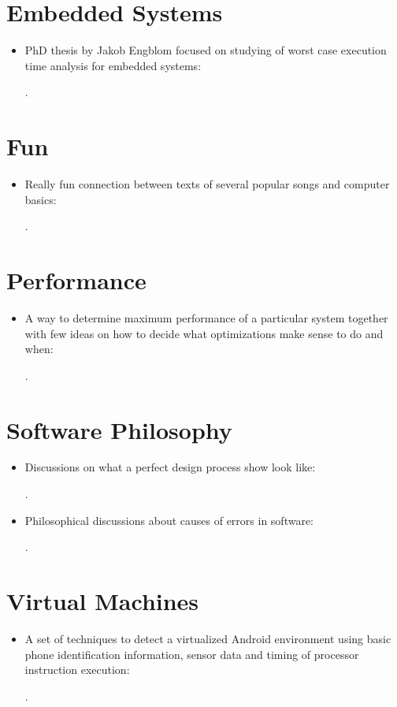 \section*{Embedded Systems}
\begin{itemize}
    \item PhD thesis by Jakob Engblom focused on studying of worst case execution time analysis for embedded systems:

    \cite{Engblom:WCET:2002}.
\end{itemize}

\section*{Fun}
\begin{itemize}
    \item Really fun connection between texts of several popular songs and computer basics:

    \cite{Colwell:Rock-N-Roll:2002}.
\end{itemize}

\section*{Performance}
\begin{itemize}
    \item A way to determine maximum performance of a particular system together with few ideas on how to decide what optimizations make sense to do and when:

    \cite{Williams:Roofline:2009}.
\end{itemize}

\section*{Software Philosophy}
\begin{itemize}
    \item Discussions on what a perfect design process show look like:

    \cite{Parnas:Fake-It:1986}.

    \item Philosophical discussions about causes of errors in software:

    \cite{Horner:Error-Rates:2019}.
\end{itemize}

\section*{Virtual Machines}
\begin{itemize}
    \item A set of techniques to detect a virtualized Android environment using basic phone identification information, sensor data and timing of processor instruction execution:

    \cite{Petsas:Android-VM-Detection:2014}.
\end{itemize}


